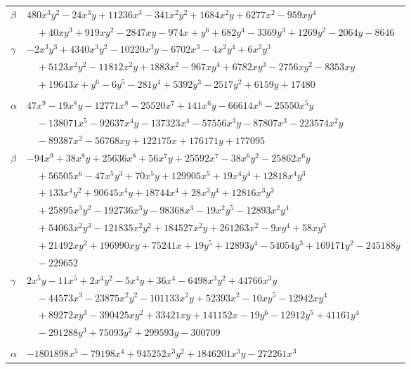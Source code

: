 \documentclass[11pt]{article}
\begin{document}
\begin{longtable}{@{}ll@{}}
$\beta$ & $480x^{3}y^{2}-24x^{3}y+11236x^{3}-341x^{2}y^{2}+1684x^{2}y+6277x^{2}-959xy^{4}$\\
 & $\quad +40xy^{3}+919xy^{2}-2847xy-974x+y^{6}+682y^{4}-3369y^{3}+1269y^{2}-2064y-8646$\\
$\gamma$ & $-2x^{3}y^{3}+4340x^{3}y^{2}-10220x^{3}y-6702x^{3}-4x^{2}y^{4}+6x^{2}y^{3}$\\
 & $\quad +5123x^{2}y^{2}-11812x^{2}y+1883x^{2}-967xy^{4}+6782xy^{3}-2756xy^{2}-8353xy$\\
 & $\quad +19643x+y^{6}-6y^{5}-281y^{4}+5392y^{3}-2517y^{2}+6159y+17480$\\
\addlinespace[3pt]
\multicolumn{2}{@{}l}{$\{i,j\}=\{80,167\}$, $k_{ij}=2^{2}\cdot 3\cdot 7\cdot 11$}\\
$\alpha$ & $47x^{9}-19x^{8}y-12771x^{8}-25520x^{7}+141x^{6}y-66614x^{6}-25550x^{5}y$\\
 & $\quad -138071x^{5}-92637x^{4}y-137323x^{4}-57556x^{3}y-87807x^{3}-223574x^{2}y$\\
 & $\quad -89387x^{2}-56768xy+122175x+176171y+177095$\\
$\beta$ & $-94x^{9}+38x^{8}y+25636x^{8}+56x^{7}y+25592x^{7}-38x^{6}y^{2}-25862x^{6}y$\\
 & $\quad +56505x^{6}-47x^{5}y^{3}+70x^{5}y+129905x^{5}+19x^{4}y^{4}+12818x^{4}y^{3}$\\
 & $\quad +133x^{4}y^{2}+90645x^{4}y+18744x^{4}+28x^{3}y^{4}+12816x^{3}y^{3}$\\
 & $\quad +25895x^{3}y^{2}-192736x^{3}y-98368x^{3}-19x^{2}y^{5}-12893x^{2}y^{4}$\\
 & $\quad +54063x^{2}y^{3}-121835x^{2}y^{2}+184527x^{2}y+261263x^{2}-9xy^{4}+58xy^{3}$\\
 & $\quad +21492xy^{2}+196990xy+75241x+19y^{5}+12893y^{4}-54054y^{3}+169171y^{2}-245188y$\\
 & $\quad -229652$\\
$\gamma$ & $2x^{5}y-11x^{5}+2x^{4}y^{2}-5x^{4}y+36x^{4}-6498x^{3}y^{2}+44766x^{3}y$\\
 & $\quad -44573x^{3}-23875x^{2}y^{2}-101133x^{2}y+52393x^{2}-10xy^{5}-12942xy^{4}$\\
 & $\quad +89272xy^{3}-390425xy^{2}+33421xy+141152x-19y^{6}-12912y^{5}+41161y^{4}$\\
 & $\quad -291288y^{3}+75093y^{2}+299593y-300709$\\
\addlinespace[3pt]
\multicolumn{2}{@{}l}{$\{i,j\}=\{80,168\}$, $k_{ij}=2\cdot 7^{2}\cdot 13\cdot 19$}\\
$\alpha$ & $-1801898x^{5}-79198x^{4}+945252x^{3}y^{2}+1846201x^{3}y-272261x^{3}$\\

\end{longtable}
\end{document}
